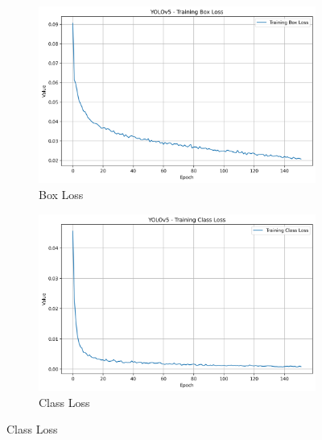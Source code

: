\documentclass{article}
\begin{document}
\begin{figure}[h!]
  \centering
  \captionsetup[subfigure]{labelformat=parens, labelsep=space}

  \begin{subfigure}[b]{0.495\textwidth}
    \centering
    \includegraphics[width=\linewidth]{img/Training Box Loss.png}
    \caption{Box Loss}
    \label{fig:boxloss}
  \end{subfigure}
  \begin{subfigure}[b]{0.495\textwidth}
    \centering
    \includegraphics[width=\linewidth]{img/Training Class Loss.png}
    \caption{Class Loss}
    \label{fig:classloss}
  \end{subfigure}

  \vspace{0.6em}


\end{figure}
\end{document}
